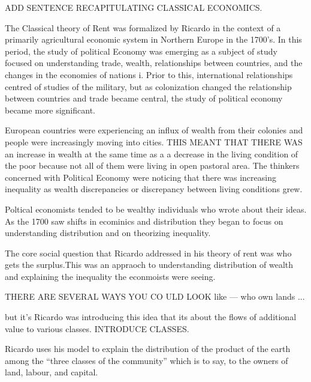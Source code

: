 ADD SENTENCE RECAPITULATING CLASSICAL ECONOMICS. 

The Classical theory of Rent was formalized by Ricardo in the context of a primarily agricultural economic system in Northern Europe in the 1700's. In this period, the study of political Economy was emerging as a subject of study focused on understanding trade, wealth, relationships between countries, and the changes in the economies of nations i. Prior to this, international relationships centred of studies of the military, but as colonization changed the relationship between countries and trade became central, the study of political economy became more significant. 

European countries were experiencing an influx of wealth from their colonies and people were increasingly moving into cities. THIS MEANT THAT THERE WAS an increase in wealth at the same time as a a decrease in the living condition of the poor because not all of them were living in open pastoral area. The thinkers concerned with Political Economy were noticing that there was increasing inequality as wealth discrepancies or discrepancy between living conditions grew. 

Poltical economists tended to be wealthy individuals who wrote about their ideas. As the 1700 saw shifts in ecominics and distribution they began to focus on understanding distribution and on theorizing inequality. 

 The core social question that Ricardo addressed in his theory of rent \cite{ricardoEssayInfluenceLow1815}
 was who gets the surplus.This was an appraoch to understanding distribution of wealth and explaining the inequality the econmoists were seeing. 
 
 THERE ARE SEVERAL  WAYS YOU CO ULD LOOK like --- who own lands ...
 
 but it's Ricardo was introducing this idea that its about the flows of additional value to various classes. INTRODUCE CLASSES. 
 
 
 
 
 
Ricardo uses his model to explain the distribution of the product of the earth among the “three classes of the community” which is to say, to the owners of land, labour, and capital. 

